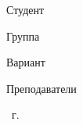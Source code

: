 \begin{titlepage}
\begin{center}
        \fontsize{14pt}{14pt}\selectfont


        \begin{flushleft}
            {Студент \uline{\myname \hfill}}

            \vspace{0.5cm}

            {Группа \uline{\mygroup \hfill}}

            \vspace{0.5cm}

            {Вариант \uline{\myvar \hfill}}

            \vspace{0.5cm}



            {Преподаватели \uline{\teachers \hfill}}



            \vspace{0.5cm}

        \end{flushleft}

        \vfill

        \the\year\ г.

    \end{center}
\end{titlepage}

